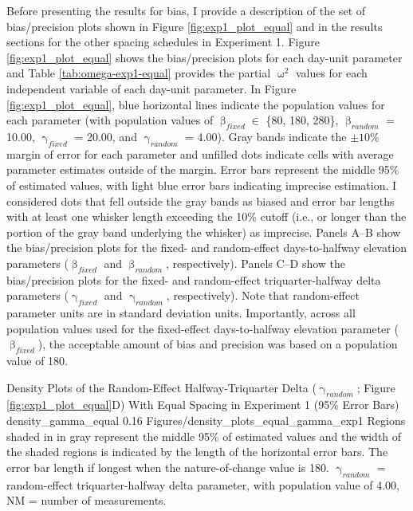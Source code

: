 \documentclass[
12pt, %
twoside,
english]{guelphthesis}
\begin{document}
Before presenting the results for bias, I provide a description of the set of bias/precision plots shown in Figure \ref{fig:exp1_plot_equal} and in the results sections for the other spacing schedules in Experiment 1. Figure \ref{fig:exp1_plot_equal} shows the bias/precision plots for each day-unit parameter and Table \ref{tab:omega-exp1-equal} provides the partial \(\upomega^2\) values for each independent variable of each day-unit parameter. In Figure \ref{fig:exp1_plot_equal}, blue horizontal lines indicate the population values for each parameter (with population values of \(\upbeta_{fixed} \in\) \{80, 180, 280\}, \(\upbeta_{random}\) = 10.00, \(\upgamma_{fixed}\) = 20.00, and \(\upgamma_{random}\) = 4.00). Gray bands indicate the \(\pm 10\%\) margin of error for each parameter and unfilled dots indicate cells with average parameter estimates outside of the margin. Error bars represent the middle 95\% of estimated values, with light blue error bars indicating imprecise estimation. I considered dots that fell outside the gray bands as biased and error bar lengths with at least one whisker length exceeding the 10\% cutoff (i.e., or longer than the portion of the gray band underlying the whisker) as imprecise. Panels A--B show the bias/precision plots for the fixed- and random-effect days-to-halfway elevation parameters (\(\upbeta_{fixed}\) and \(\upbeta_{random}\), respectively). Panels C--D show the bias/precision plots for the fixed- and random-effect triquarter-halfway delta parameters (\(\upgamma_{fixed}\) and \(\upgamma_{random}\), respectively). Note that random-effect parameter units are in standard deviation units. Importantly, across all population values used for the fixed-effect days-to-halfway elevation parameter (\(\upbeta_{fixed}\)), the acceptable amount of bias and precision was based on a population value of 180.
\begin{apaFigure}
[portrait]
[samepage]
[0cm]
{Density Plots of the Random-Effect Halfway-Triquarter Delta ($\upgamma_{random}$; Figure \ref{fig:exp1_plot_equal}D) With Equal Spacing in Experiment 1 (95\% Error Bars)}
{density_gamma_equal}
{0.16}
{Figures/density_plots_equal_gamma_exp1}
{Regions shaded in in gray represent the middle 95\% of estimated values and the width of the shaded regions is indicated by the length of the horizontal error bars. The error bar length if longest when the nature-of-change value is 180. $\upgamma_{random}$ = random-effect triquarter-halfway delta parameter, with population value of 4.00, NM = number of measurements.}
\end{apaFigure}
\end{document}
